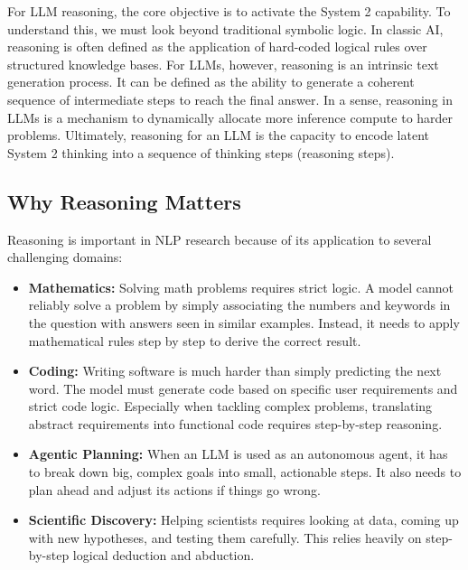 For LLM reasoning, the core objective is to activate the System 2 capability. To understand this, we must look beyond traditional symbolic logic. In classic AI, reasoning is often defined as the application of hard-coded logical rules over structured knowledge bases. For LLMs, however, reasoning is an intrinsic text generation process. It can be defined as the ability to generate a coherent sequence of intermediate steps to reach the final answer. In a sense, reasoning in LLMs is a mechanism to dynamically allocate more inference compute to harder problems. Ultimately, reasoning for an LLM is the capacity to encode latent System 2 thinking into a sequence of thinking steps (reasoning steps).

\subsection{Why Reasoning Matters}

Reasoning is important in NLP research because of its application to several challenging domains:

\begin{itemize}
\item \vspace{0.5cm} \textbf{Mathematics:} Solving math problems requires strict logic. A model cannot reliably solve a problem by simply associating the numbers and keywords in the question with answers seen in similar examples. Instead, it needs to apply mathematical rules step by step to derive the correct result.
\item \vspace{0.2cm} \textbf{Coding:} Writing software is much harder than simply predicting the next word. The model must generate code based on specific user requirements and strict code logic. Especially when tackling complex problems, translating abstract requirements into functional code requires step-by-step reasoning.
\item \vspace{0.2cm} \textbf{Agentic Planning:} When an LLM is used as an autonomous agent, it has to break down big, complex goals into small, actionable steps. It also needs to plan ahead and adjust its actions if things go wrong.
\item \vspace{0.2cm} \textbf{Scientific Discovery:} Helping scientists requires looking at data, coming up with new hypotheses, and testing them carefully. This relies heavily on step-by-step logical deduction and abduction.
\end{itemize}
\vspace{0.3cm}

